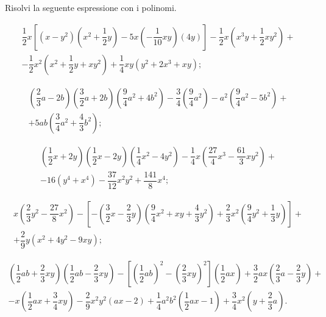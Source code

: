 \begin{esercizio}[\Ast] %
\label{ese:11.51}
Risolvi la seguente espressione con i polinomi.
\begin{enumeratea}
 \item
 \begin{multline*}
 \dfrac{1}{2}x\left[\left(x-y^{2}\right)\left(x^{2}+\dfrac{1}{2}y\right)-5x\left(-{\dfrac{1}{10}}{xy}\right)(4y)\right]-\dfrac{1}{2}x\left(x^{3}y+\dfrac{1}{2}xy^{2}\right)+\\
 -\dfrac{1}{2}x^{2}\left(x^{2}+\dfrac{1}{2}y+{xy}^{2}\right)+\dfrac{1}{4}{xy}\left(y^{2}+2x^{3}+{xy}\right);
 \end{multline*}
 \item
 \begin{multline*}
 \left(\dfrac{2}{3}a-2b\right)\left(\dfrac{3}{2}a+2b\right)\left(\dfrac{9}{4}a^{2}+4b^{2}\right)-\dfrac{3}{4}\left(\dfrac{9}{4}a^{2}\right)-a^{2}\left(\dfrac{9}{4}a^{2}-5b^{2}\right)+\\
 +5{ab}\left(\dfrac{3}{4}a^{2}+\dfrac{4}{3}b^{2}\right);
 \end{multline*}
 \item
 \begin{multline*}
 \left(\dfrac{1}{2}x+2y\right)\left(\dfrac{1}{2}x-2y\right)\left(\dfrac{1}{4}x^{2}-4y^{2}\right)-\dfrac{1}{4}x\left(\dfrac{27}{4}x^{3}-\dfrac{61}{3}xy^{2}\right)+\\
 -16\left(y^{4}+x^{4}\right)-\dfrac{37}{12}x^{2}y^{2}+\dfrac{141}{8}x^{4};
 \end{multline*}
 \item
 \begin{multline*}
 x\left(\dfrac{2}{3}y^{2}-\dfrac{27}{8}x^{2}\right)-\left[-\left(\dfrac{3}{2}x-\dfrac{2}{3}y\right)\left(\dfrac{9}{4}x^{2}+xy+\dfrac{4}{3}y^{2}\right)+\dfrac{2}{3}x^{2}\left(\dfrac{9}{4}y^{2}+\dfrac{1}{3}y\right)\right]+\\
 +\dfrac{2}{9}y\left(x^{2}+4y^{2}-9xy\right);
 \end{multline*}
 \item
 \begin{multline*}
 \left(\dfrac{1}{2}ab+\dfrac{2}{3}xy\right)\left(\dfrac{1}{2}ab-\dfrac{2}{3}xy\right)-\left[\left(\dfrac{1}{2}ab\right)^{2}-\left(\dfrac{2}{3}xy\right)^{2}\right]\left(\dfrac{1}{2}ax\right)+\dfrac{3}{2}ax\left(\dfrac{2}{3}a-\dfrac{2}{3}y\right)+\\
 -x\left(\dfrac{1}{2}ax+\dfrac{3}{4}xy\right)-\dfrac{2}{9}x^{2}y^{2}(ax-2)+\dfrac{1}{4}a^{2}b^{2}\left(\dfrac{1}{2}ax-1\right)+\dfrac{3}{4}x^{2}\left(y+\dfrac{2}{3}a\right).
 \end{multline*}
\end{enumeratea}
\end{esercizio}

